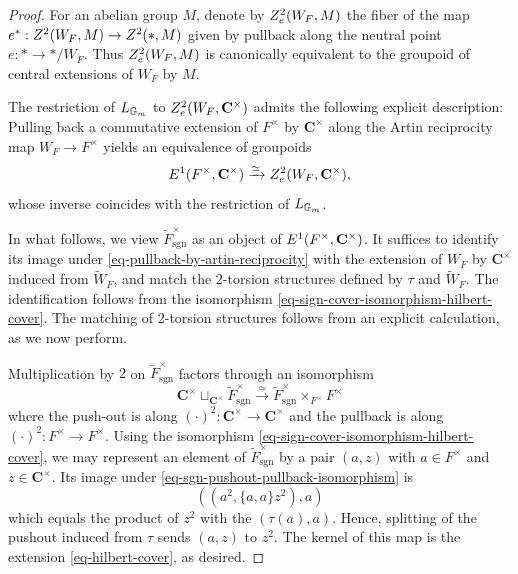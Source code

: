 \documentclass[10pt,a4paper]{amsart}
\newcommand{\Langlands}{\textnormal{\textsf{L}}}
\newcommand{\complexes}{\mathbf C}
\newcommand{\cycle}{\textnormal{\textsf{Z}}}
\newcommand{\extension}{\textnormal{\textsf{E}}}
\newcommand{\sgn}{\mathrm{sgn}}
\begin{document}
\begin{proof}
For an abelian group $M$, denote by $\cycle^2_e(W_F, M)$ the fiber of the map $e^* : \cycle^2(W_F, M) \rightarrow \cycle^2(*, M)$ given by pullback along the neutral point $e : * \rightarrow */W_F$. Thus $\cycle^2_e(W_F, M)$ is canonically equivalent to the groupoid of central extensions of $W_F$ by $M$.

The restriction of $\Langlands_{\mathbb G_m}$ to $\cycle^2_e(W_F, \complexes^{\times})$ admits the following explicit description: Pulling back a commutative extension of $F^{\times}$ by $\complexes^{\times}$ along the Artin reciprocity map $W_F \rightarrow F^{\times}$ yields an equivalence of groupoids
\begin{equation}
\label{eq-pullback-by-artin-reciprocity}
\extension^1(F^{\times}, \complexes^{\times}) \xrightarrow{\simeq} \cycle^2_e(W_F, \complexes^{\times}),
\end{equation}
whose inverse coincides with the restriction of $\Langlands_{\mathbb G_m}$.

In what follows, we view $\widetilde F^{\times}_{\sgn}$ as an object of $\extension^1(F^{\times}, \complexes^{\times})$. It suffices to identify its image under \eqref{eq-pullback-by-artin-reciprocity} with the extension of $W_F$ by $\complexes^{\times}$ induced from $\widetilde W_F$, and match the $2$-torsion structures defined by $\tau$ and $\widetilde W_F$. The identification follows from the isomorphism \eqref{eq-sign-cover-isomorphism-hilbert-cover}. The matching of $2$-torsion structures follows from an explicit calculation, as we now perform.

Multiplication by $2$ on $\widetilde F^{\times}_{\sgn}$ factors through an isomorphism
\begin{equation}
\label{eq-sgn-pushout-pullback-isomorphism}
\complexes^{\times} \sqcup_{\complexes^{\times}} \widetilde F^{\times}_{\sgn} \xrightarrow{\simeq} \widetilde F^{\times}_{\sgn} \times_{F^{\times}} F^{\times}
\end{equation}
where the push-out is along $(\cdot)^2 : \complexes^{\times} \rightarrow \complexes^{\times}$ and the pullback is along $(\cdot)^2 : F^{\times} \rightarrow F^{\times}$. Using the isomorphism \eqref{eq-sign-cover-isomorphism-hilbert-cover}, we may represent an element of $\widetilde F^{\times}_{\sgn}$ by a pair $(a, z)$ with $a \in F^{\times}$ and $z\in\complexes^{\times}$. Its image under \eqref{eq-sgn-pushout-pullback-isomorphism} is
$$
((a^2, \{a, a\} z^2), a)
$$
which equals the product of $z^2$ with the $(\tau(a), a)$. Hence, splitting of the pushout induced from $\tau$ sends $(a, z)$ to $z^2$. The kernel of this map is the extension \eqref{eq-hilbert-cover}, as desired.
\end{proof}
\end{document}

